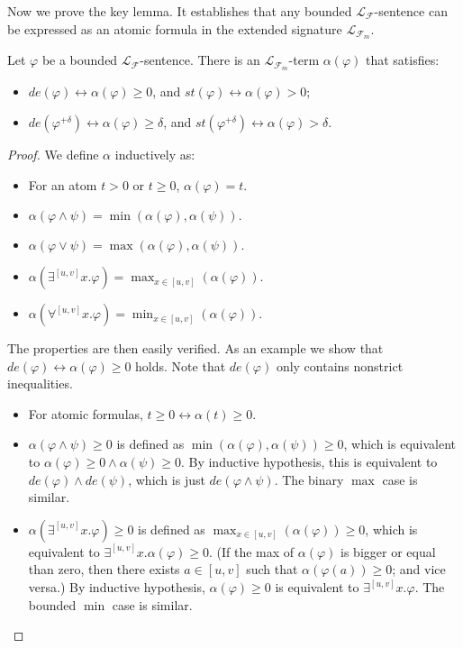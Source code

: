 \documentclass[prodmode]{acmsmall} %
\begin{document}
Now we prove the key lemma. It establishes that any bounded $\mathcal{L}_{\mathcal{F}}$-sentence can be expressed as an atomic formula in the extended signature $\mathcal{L}_{\mathcal{F}_m}$. 

\begin{lemma}\label{kk}
Let $\varphi$ be a bounded $\mathcal{L}_{\mathcal{F}}$-sentence. There is an $\mathcal{L}_{\mathcal{F}_m}$-term $\alpha(\varphi)$ that satisfies:
\begin{itemize}
\item $\mathit{de}(\varphi)\leftrightarrow\alpha(\varphi)\geq 0$, and $\mathit{st}(\varphi)\leftrightarrow\alpha(\varphi)> 0$;
\item $\mathit{de}(\varphi^{+\delta})\leftrightarrow\alpha(\varphi)\geq \delta$, and $\mathit{st}(\varphi^{+\delta})\leftrightarrow \alpha(\varphi)>\delta$.   
\end{itemize}
\end{lemma}

\begin{proof}
We define $\alpha$ inductively as:
\begin{itemize}
\item For an atom $t>0$ or $t\geq 0$, $\alpha(\varphi) = t$. 
\item $\alpha(\varphi\wedge\psi) = \min(\alpha(\varphi), \alpha(\psi)).$
\item $\alpha(\varphi\vee\psi) = \max(\alpha(\varphi), \alpha(\psi)).$
\item $\alpha(\exists^{[u,v]}x.\varphi) = \max_{x\in [u,v]}(\alpha(\varphi)).$
\item $\alpha(\forall^{[u,v]}x.\varphi) = \min_{x\in [u,v]}(\alpha(\varphi)). $ 
\end{itemize} 
The properties are then easily verified. As an example we show that $\mathit{de}(\varphi)\leftrightarrow \alpha(\varphi)\geq 0$ holds. Note that $\mathit{de(\varphi)}$ only contains nonstrict inequalities.  
\begin{itemize}
\item For atomic formulas, $t\geq 0 \leftrightarrow \alpha(t)\geq 0$.
\item $\alpha(\varphi\wedge \psi)\geq 0$ is defined as $\min(\alpha(\varphi),\alpha(\psi))\geq 0$, which is equivalent to $\alpha(\varphi)\geq 0 \wedge \alpha(\psi)\geq 0$. By inductive hypothesis, this is equivalent to $\mathit{de}(\varphi)\wedge\mathit{de}(\psi)$, which is just $\mathit{de}(\varphi\wedge\psi)$. The binary $\max$ case is similar. 
\item $\alpha(\exists^{[u,v]} x.\varphi)\geq 0$ is defined as $\max_{x\in [u,v]}(\alpha(\varphi))\geq 0$, which is equivalent to $\exists^{[u,v]}x. \alpha(\varphi)\geq 0$. (If the max of $\alpha(\varphi)$ is bigger or equal than zero, then there exists $a\in [u,v]$ such that $\alpha(\varphi(a))\geq 0$; and vice versa.) By inductive hypothesis, $\alpha(\varphi)\geq 0$ is equivalent to $\exists^{[u,v]}x. \varphi$. The bounded $\min$ case is similar. 
\end{itemize}
\end{proof}
\end{document}

